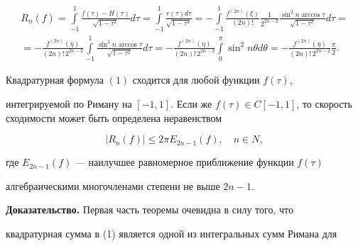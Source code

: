\begin{gather*}


R_n(f) = \int \limits_{-1}^1 \frac{f( \tau) - H( \tau) } { \sqrt{1-


\tau^2} } d \tau = \int \limits_{-1}^1 \frac{r( \tau) d \tau} { \sqrt{1-


\tau^2} } =


- \int \limits_{-1}^1 \frac{f^{(2n)}( \xi)} {(2n)!} \frac{1} {2^


{2n-2}} \frac{ \sin^2 n \arccos \tau} { \sqrt{1- \tau^2} } d \tau =\\


%


= - \frac{f^{(2n)}( \eta)} {(2n)! \, 2^{2n-2} } \int \limits_


{-1}^1 \frac{ \sin^2 n \arccos \tau}{ \sqrt{1- \tau^2} } d \tau=


- \frac{f^{(2n)}(\eta)}{(2n)! \, 2^{2n-2} } \int \limits_0^{ \pi} 


\sin^2 n \theta d \theta = - \frac{f^{(2n)}( \eta)} {(2n)! \, 2^{2n-2} } 


\frac{ \pi}{2}.


\end{gather*}





\begin{thm}


Квадратурная формула $(1)$ сходится для любой функции $f(\tau)$,


интегрируемой по Риману на $[-1,1]$. Если же $f( \tau) \in


C[-1,1]$, то скорость сходимости может быть определена неравенством


\begin{equation}


|R_n(f) | \leq 2 \pi E_{2n-1}(f), \quad n \in N,


\end{equation}


где $E_{2n-1}(f)$ --- наилучшее равномерное приближение функции $f(\tau)$


алгебраическими многочленами степени не выше $2n-1$.


\end{thm}





{\bf Доказательство.} Первая часть теоремы очевидна в силу того, что


квадратурная сумма в (1) является одной из интегральных сумм Римана для


